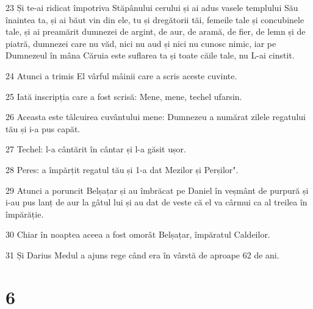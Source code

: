 \par 23 Și te-ai ridicat împotriva Stăpânului cerului și ai adus vasele templului Său înaintea ta, și ai băut vin din ele, tu și dregătorii tăi, femeile tale și concubinele tale, și ai preamărit dumnezei de argint, de aur, de aramă, de fier, de lemn și de piatră, dumnezei care nu văd, nici nu aud și nici nu cunosc nimic, iar pe Dumnezeul în mâna Căruia este suflarea ta și toate căile tale, nu L-ai cinstit.
\par 24 Atunci a trimis El vârful mâinii care a scris aceste cuvinte.
\par 25 Iată inscripția care a fost scrisă: Mene, mene, techel ufarsin.
\par 26 Aceasta este tâlcuirea cuvântului mene: Dumnezeu a numărat zilele regatului tău și i-a pus capăt.
\par 27 Techel: l-a cântărit în cântar și l-a găsit ușor.
\par 28 Peres: a împărțit regatul tău și 1-a dat Mezilor și Perșilor".
\par 29 Atunci a poruncit Belșațar și au îmbrăcat pe Daniel în veșmânt de purpură și i-au pus lanț de aur la gâtul lui și au dat de veste că el va cârmui ca al treilea în împărăție.
\par 30 Chiar în noaptea aceea a fost omorât Belșațar, împăratul Caldeilor.
\par 31 Și Darius Medul a ajuns rege când era în vârstă de aproape 62 de ani.

\chapter{6}

